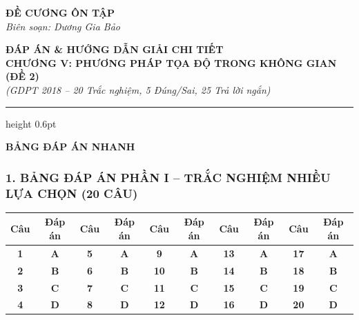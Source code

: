 \documentclass[12pt,a4paper]{article}
\begin{document}
\thispagestyle{firstpage}

\noindent
\begin{minipage}[t]{0.36\textwidth}
    \centering
    {\fontsize{12}{14}\selectfont\textbf{ĐỀ CƯƠNG ÔN TẬP}}\\[4pt]
    \textit{Biên soạn: Dương Gia Bảo}\\[6pt]
    \setlength{\fboxrule}{0.8pt}
    \setlength{\fboxsep}{5pt}
\end{minipage}\hfill
\begin{minipage}[t]{0.62\textwidth}
    \centering
    {\fontsize{13}{15}\selectfont\textbf{ĐÁP ÁN \& HƯỚNG DẪN GIẢI CHI TIẾT}}\\[3pt]
    {\fontsize{12}{14}\selectfont\textbf{CHƯƠNG V: PHƯƠNG PHÁP TỌA ĐỘ TRONG KHÔNG GIAN (ĐỀ 2)}}\\[3pt]
    {\fontsize{11}{13}\selectfont\textit{(GDPT 2018 -- 20 Trắc nghiệm, 5 Đúng/Sai, 25 Trả lời ngắn)}}
\end{minipage}

\par\vspace{4pt}
\hrule height 0.6pt
\vspace{8pt}

\begin{center}
    {\fontsize{13}{15}\selectfont\textbf{BẢNG ĐÁP ÁN NHANH}}
\end{center}

\subsubsection*{1. BẢNG ĐÁP ÁN PHẦN I -- TRẮC NGHIỆM NHIỀU LỰA CHỌN (20 CÂU)}

\begin{center}
\renewcommand{\arraystretch}{1.22}
\begin{tabular}{|c|c||c|c||c|c||c|c||c|c|}
\hline
\textbf{Câu} & \textbf{Đáp án} & \textbf{Câu} & \textbf{Đáp án} & \textbf{Câu} & \textbf{Đáp án} & \textbf{Câu} & \textbf{Đáp án} & \textbf{Câu} & \textbf{Đáp án} \\ \hline
\textbf{1} & \textbf{A} & \textbf{5} & \textbf{A} & \textbf{9} & \textbf{A} & \textbf{13} & \textbf{A} & \textbf{17} & \textbf{A} \\ \hline
\textbf{2} & \textbf{B} & \textbf{6} & \textbf{B} & \textbf{10} & \textbf{B} & \textbf{14} & \textbf{B} & \textbf{18} & \textbf{B} \\ \hline
\textbf{3} & \textbf{C} & \textbf{7} & \textbf{C} & \textbf{11} & \textbf{C} & \textbf{15} & \textbf{C} & \textbf{19} & \textbf{C} \\ \hline
\textbf{4} & \textbf{D} & \textbf{8} & \textbf{D} & \textbf{12} & \textbf{D} & \textbf{16} & \textbf{D} & \textbf{20} & \textbf{D} \\ \hline
\end{tabular}
\end{center}
\end{document}
